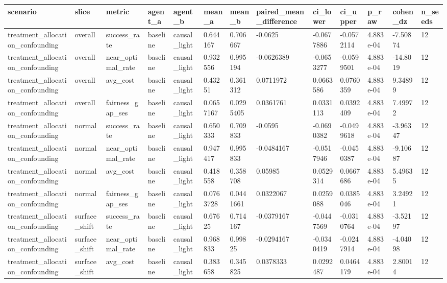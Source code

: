 \begin{tabular}{lllllllllllll}
\toprule
scenario & slice & metric & agent\_a & agent\_b & mean\_a & mean\_b & paired\_mean\_difference & ci\_lower & ci\_upper & p\_raw & cohen\_dz & n\_seeds \\
\midrule
treatment\_allocation\_confounding & overall & success\_rate & baseline & causal\_light & 0.644167 & 0.706667 & -0.0625 & -0.0677886 & -0.0572114 & 4.883e-04 & -7.50874 & 12 \\
treatment\_allocation\_confounding & overall & near\_optimal\_rate & baseline & causal\_light & 0.932556 & 0.995194 & -0.0626389 & -0.0653277 & -0.0599501 & 4.883e-04 & -14.8019 & 12 \\
treatment\_allocation\_confounding & overall & avg\_cost & baseline & causal\_light & 0.43251 & 0.361312 & 0.0711972 & 0.0663586 & 0.0760359 & 4.883e-04 & 9.34899 & 12 \\
treatment\_allocation\_confounding & overall & fairness\_gap\_ses & baseline & causal\_light & 0.0657167 & 0.0295405 & 0.0361761 & 0.0331113 & 0.0392409 & 4.883e-04 & 7.49972 & 12 \\
treatment\_allocation\_confounding & normal & success\_rate & baseline & causal\_light & 0.650333 & 0.709833 & -0.0595 & -0.0690382 & -0.0499618 & 4.883e-04 & -3.96347 & 12 \\
treatment\_allocation\_confounding & normal & near\_optimal\_rate & baseline & causal\_light & 0.947417 & 0.995833 & -0.0484167 & -0.0517946 & -0.0450387 & 4.883e-04 & -9.10687 & 12 \\
treatment\_allocation\_confounding & normal & avg\_cost & baseline & causal\_light & 0.418558 & 0.358708 & 0.05985 & 0.0529314 & 0.0667686 & 4.883e-04 & 5.49635 & 12 \\
treatment\_allocation\_confounding & normal & fairness\_gap\_ses & baseline & causal\_light & 0.0763728 & 0.0441661 & 0.0322067 & 0.0259088 & 0.0385046 & 4.883e-04 & 3.24921 & 12 \\
treatment\_allocation\_confounding & surface\_shift & success\_rate & baseline & causal\_light & 0.67625 & 0.714167 & -0.0379167 & -0.0447569 & -0.0310764 & 4.883e-04 & -3.52197 & 12 \\
treatment\_allocation\_confounding & surface\_shift & near\_optimal\_rate & baseline & causal\_light & 0.968833 & 0.99825 & -0.0294167 & -0.0340419 & -0.0247914 & 4.883e-04 & -4.04098 & 12 \\
treatment\_allocation\_confounding & surface\_shift & avg\_cost & baseline & causal\_light & 0.383658 & 0.345825 & 0.0378333 & 0.0292487 & 0.0464179 & 4.883e-04 & 2.80014 & 12 \\

\end{tabular}
